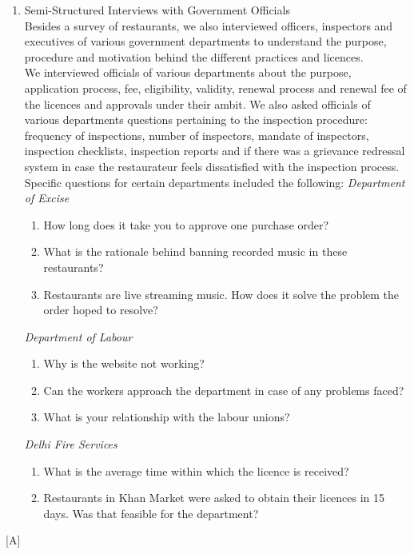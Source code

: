 \documentclass[a4paper, 12pt]{article}
\begin{document}
\begin{enumerate} [A,B,C]
		\item Semi-Structured Interviews with Government Officials\\
		Besides a survey of restaurants, we also interviewed officers, inspectors and executives of various government departments to understand the purpose, procedure and motivation behind the different practices and licences.\\
		We interviewed officials of various departments about the purpose, application process, fee, eligibility, validity, renewal process and renewal fee of the licences and approvals under their ambit. We also asked officials of various departments questions pertaining to the inspection procedure: frequency of inspections, number of inspectors, mandate of inspectors, inspection checklists, inspection reports and if there was a grievance redressal system in case the restaurateur feels dissatisfied with the inspection process.\\
		Specific questions for certain departments included the following:
		\textit {Department of Excise} 
			\begin {enumerate}
			\item How long does it take you to approve one purchase order? 
			\item What is the rationale behind banning recorded music in these restaurants?
			\item Restaurants are live streaming music. How does it solve the problem the order hoped to resolve?
			\end {enumerate}
		\textit {Department of Labour}
			\begin {enumerate} 
			\item Why is the website not working? 
			\item Can the workers approach the department in case of any problems faced?
			\item What is your relationship with the labour unions?
			\end {enumerate}
		\textit {Delhi Fire Services}
		\begin {enumerate} 
		\item What is the average time within which the licence is received?
		\item Restaurants in Khan Market were asked to obtain their licences in 15 days. Was that feasible for the department?
		\end {enumerate}
		
 		\end {enumerate} [A]
\end{document}
